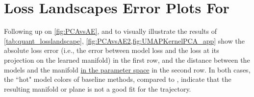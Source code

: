 \documentclass[letterpaper]{article} %
\begin{document}
     
    
    \section{Loss Landscapes Error Plots For \cophy{}} \label{app:errors_cophy}

    Following up on \cref{fig:PCAvsAE}, and to visually illustrate the results of \cref{tab:quant_losslandscape}, \cref{fig:PCAvsAE2,fig:UMAPKernelPCA_app} show the absolute loss error (i.e., the error between model loss and the loss at its projection on the learned manifold) in the first row, 
    and the distance between the models and the manifold \underline{in the parameter space} in the second row. In both cases, the ``hot" model colors of baseline methods, compared to \proposedautencoder{}, indicate that the resulting manifold or plane is not a good fit for the trajectory.%

     
\end{document}
